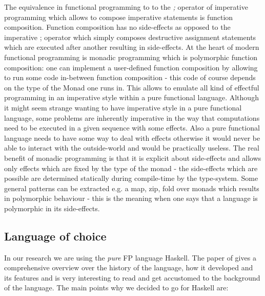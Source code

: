 The equivalence in functional programming to to the \textit{;} operator of imperative programming which allows to compose imperative statements is function composition. Function composition has no side-effects as opposed to the imperative ; operator which simply composes destructive assignment statements which are executed after another resulting in side-effects.
At the heart of modern functional programming is monadic programming which is polymorphic function composition: one can implement a user-defined function composition by allowing to run some code in-between function composition - this code of course depends on the type of the Monad one runs in. This allows to emulate all kind of effectful programming in an imperative style within a pure functional language. Although it might seem strange wanting to have imperative style in a pure functional language, some problems are inherently imperative in the way that computations need to be executed in a given sequence with some effects. Also a pure functional language needs to have some way to deal with effects otherwise it would never be able to interact with the outside-world and would be practically useless. The real benefit of monadic programming is that it is explicit about side-effects and allows only effects which are fixed by the type of the monad - the side-effects which are possible are determined statically during compile-time by the type-system. Some general patterns can be extracted e.g. a map, zip, fold over monads which results in polymorphic behaviour - this is the meaning when one says that a language is polymorphic in its side-effects.

\subsection{Language of choice}
In our research we are using the \textit{pure} FP language Haskell. The paper of \cite{hudak_history_2007} gives a comprehensive overview over the history of the language, how it developed and its features and is very interesting to read and get accustomed to the background of the language. The main points why we decided to go for Haskell are:

